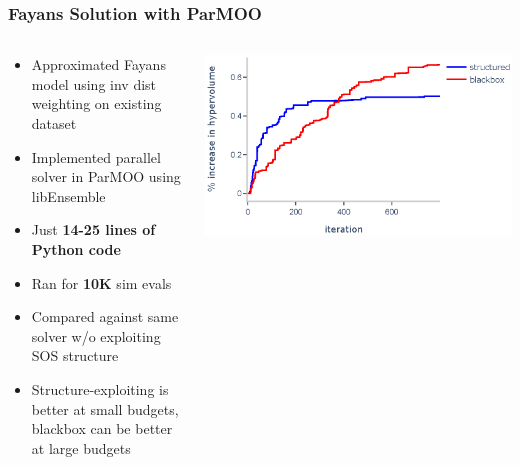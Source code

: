 \documentclass[aspectratio=169]{beamer}
\begin{document}
\begin{frame}\frametitle{Fayans Solution with ParMOO}
\begin{columns}
\begin{column}{0.5\textwidth}
\begin{itemize}
\item Approximated Fayans model using inv dist weighting on existing dataset
\item {\color{blue}
Implemented parallel solver in ParMOO} using libEnsemble
\item Just {\bf 14-25 lines of Python code}
\item Ran for {\bf 10K} sim evals
\item Compared against
{\color{red} same solver w/o exploiting SOS structure}
\item Structure-exploiting is better at small budgets, blackbox can be better at large budgets
\end{itemize}
\end{column}
\begin{column}{0.5\textwidth}
\includegraphics[width=\textwidth]{hv_1.eps}
\end{column}
\end{columns}
\end{frame}
\end{document}
